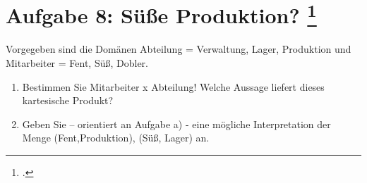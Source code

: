 \documentclass{lehramt-informatik-aufgabe}
\begin{document}

\section{Aufgabe 8: Süße Produktion?
\footcite{db:ab:klausurvorbereitung}}

Vorgegeben sind die Domänen Abteilung = Verwaltung, Lager, Produktion
und Mitarbeiter = Fent, Süß, Dobler.

\begin{enumerate}


\item Bestimmen Sie Mitarbeiter x Abteilung! Welche Aussage liefert
dieses kartesische Produkt?


\item Geben Sie – orientiert an Aufgabe a) - eine mögliche
Interpretation der Menge (Fent,Produktion), (Süß, Lager) an.

\end{enumerate}
\end{document}
